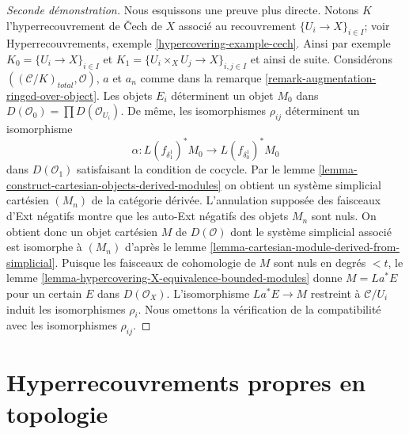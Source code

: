\begin{proof}[Seconde démonstration]
Nous esquissons une preuve plus directe.
Notons $K$ l'hyperrecouvrement de Čech de $X$ associé au
recouvrement $\{U_i \to X\}_{i \in I}$; voir
Hyperrecouvrements, exemple \ref{hypercovering-example-cech}.
Ainsi par exemple $K_0 = \{U_i \to X\}_{i \in I}$ et
$K_1 = \{U_i \times_X U_j \to X\}_{i, j \in I}$ et ainsi de suite.
Considérons $((\mathcal{C}/K)_{total}, \mathcal{O})$, $a$ et $a_n$ comme dans la
remarque \ref{remark-augmentation-ringed-over-object}.
Les objets $E_i$ déterminent un objet $M_0$ dans
$D(\mathcal{O}_0) = \prod D(\mathcal{O}_{U_i})$.
De même, les isomorphismes $\rho_{ij}$ déterminent un isomorphisme
$$
\alpha :
L(f_{\delta_1^1})^*M_0
\longrightarrow
L(f_{\delta_0^1})^*M_0
$$
dans $D(\mathcal{O}_1)$ satisfaisant la condition de cocycle.
Par le lemme \ref{lemma-construct-cartesian-objects-derived-modules}
on obtient un système simplicial cartésien $(M_n)$ de la catégorie dérivée.
L'annulation supposée des faisceaux d'Ext négatifs montre que
les auto-Ext négatifs des objets $M_n$ sont nuls.
On obtient donc un objet cartésien $M$ de $D(\mathcal{O})$
dont le système simplicial associé est isomorphe à $(M_n)$ d'après le
lemme \ref{lemma-cartesian-module-derived-from-simplicial}.
Puisque les faisceaux de cohomologie de $M$ sont nuls en degrés $< t$,
le lemme \ref{lemma-hypercovering-X-equivalence-bounded-modules}
donne $M = La^*E$ pour un certain $E$ dans $D(\mathcal{O}_X)$.
L'isomorphisme $La^*E \to M$ restreint à $\mathcal{C}/U_i$
induit les isomorphismes $\rho_i$. Nous omettons la vérification
de la compatibilité avec les isomorphismes $\rho_{ij}$.
\end{proof}












\section{Hyperrecouvrements propres en topologie}
\label{section-proper-hypercovering}

